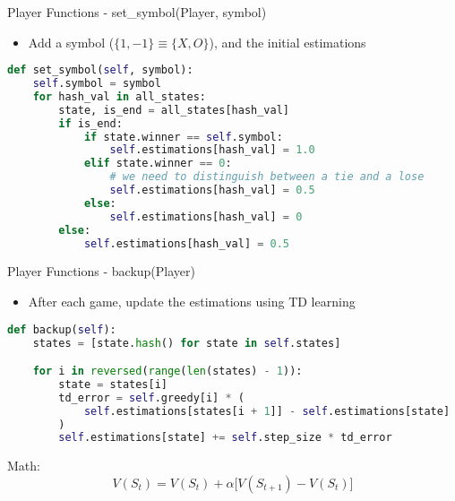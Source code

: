 \documentclass{beamer}
\begin{document}
\begin{frame}[fragile]{Player Functions - set\_symbol(Player, symbol)}
\begin{itemize}
	\item Add a symbol ($\{1,-1\} \equiv \{X,O\}$), and the initial estimations
\end{itemize}
\begin{lstlisting}[language=Python]
def set_symbol(self, symbol):
    self.symbol = symbol
    for hash_val in all_states:
        state, is_end = all_states[hash_val]
        if is_end:
            if state.winner == self.symbol:
                self.estimations[hash_val] = 1.0
            elif state.winner == 0:
                # we need to distinguish between a tie and a lose
                self.estimations[hash_val] = 0.5
            else:
                self.estimations[hash_val] = 0
        else:
            self.estimations[hash_val] = 0.5
\end{lstlisting}
\end{frame}
\begin{frame}[fragile]{Player Functions - backup(Player)}
\begin{itemize}
	\item After each game, update the estimations using TD learning
\end{itemize}
\begin{lstlisting}[language=Python]
def backup(self):
    states = [state.hash() for state in self.states]

    for i in reversed(range(len(states) - 1)):
        state = states[i]
        td_error = self.greedy[i] * (
            self.estimations[states[i + 1]] - self.estimations[state]
        )
        self.estimations[state] += self.step_size * td_error
\end{lstlisting}
Math:
\[V(S_t) = V(S_t) + \alpha \Big[V(S_{t+1})-V(S_t)\Big] \]
\end{frame}
\end{document}
